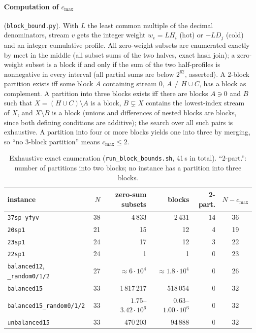 \documentclass[11pt,a4paper]{report}
\newcommand*{\inst}[1]{\texttt{#1}}
\begin{document}
\paragraph{Computation of $c_{\max}$} (\texttt{block\_bound.py}). With $L$ the least common multiple of the decimal
denominators, stream $v$ gets the integer weight $w_v=LH_i$ (hot) or $-LD_j$ (cold) and an integer cumulative
profile. All zero-weight subsets are enumerated exactly by meet in the middle (all subset sums of the two halves,
exact hash join); a zero-weight subset is a block if and only if the sum of the two half-profiles is nonnegative in
every interval (all partial sums are below $2^{62}$, asserted). A 2-block partition exists iff some block $A$
containing stream $0$, $A\ne H\cup C$, has a block as complement. A partition into three blocks exists iff there are
blocks $A\ni0$ and $B$ such that $X=(H\cup C)\setminus A$ is a block, $B\subsetneq X$ contains the lowest-index stream
of $X$, and $X\setminus B$ is a block (unions and differences of nested blocks are blocks, since both defining
conditions are additive); the search over all such pairs is exhaustive. A partition into four or more blocks yields
one into three by merging, so ``no 3-block partition'' means $c_{\max}\le2$.

\begin{table}[h]
\centering\footnotesize
\caption{Exhaustive exact enumeration (\texttt{run\_block\_bounds.sh}, 41\,s in total). ``2-part.'': number of
partitions into two blocks; no instance has a partition into three blocks.}\label{tab:block}
\setlength{\tabcolsep}{4pt}
\begin{tabular}{@{}lrrrrc@{}}
\toprule
instance & $N$ & zero-sum subsets & blocks & 2-part. & $N-c_{\max}$ \\
\midrule
\inst{37sp-yfyv} & 38 & 4\,833 & 2\,431 & 14 & 36 \\
\inst{20sp1} & 21 & 15 & 12 & 4 & 19 \\
\inst{23sp1} & 24 & 17 & 12 & 3 & 22 \\
\inst{22sp1} & 24 & 1 & 1 & 0 & 23 \\
\inst{balanced12}, \inst{\_random0/1/2} & 27 & $\approx6\cdot10^4$ & $\approx1.8\cdot10^4$ & 0 & 26 \\
\inst{balanced15} & 33 & 1\,817\,217 & 518\,054 & 0 & 32 \\
\inst{balanced15\_random0/1/2} & 33 & $1.75$--$3.42\cdot10^6$ & $0.63$--$1.00\cdot10^6$ & 0 & 32 \\
\inst{unbalanced15} & 33 & 470\,203 & 94\,888 & 0 & 32 \\
\bottomrule
\end{tabular}
\end{table}
\end{document}

